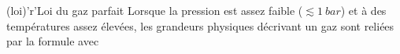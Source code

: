 \documentclass[../../main/main.tex]{subfiles}
\begin{document}
\begin{tcbraster}[raster columns=2, raster equal height=rows]
\begin{tcb}[label=def:gp]
\begin{minipage}{0.49\linewidth}
		\end{minipage}
	\end{tcb}
	\begin{tcb}[label=loi:gp](loi)'r'{Loi du gaz parfait}
		Lorsque la pression est assez faible ($\lesssim \SI{1}{bar}$) et à des
		températures assez élevées, les grandeurs physiques décrivant un gaz
		sont reliées par la formule
		avec
		\vspace{-15pt}
	\end{tcb}
\end{tcbraster}
\end{document}
